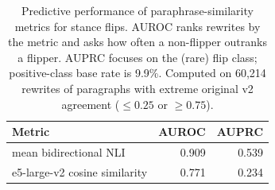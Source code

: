 \begin{table}[h]
  \centering
  \caption{Predictive performance of paraphrase-similarity metrics for stance flips. AUROC ranks rewrites by the metric and asks how often a non-flipper outranks a flipper. AUPRC focuses on the (rare) flip class; positive-class base rate is 9.9\%. Computed on 60,214 rewrites of paragraphs with extreme original v2 agreement ($\leq 0.25$ or $\geq 0.75$).}
  \label{tab:flip-prediction}
  \begin{tabular}{lrr}
    \toprule
    Metric & AUROC & AUPRC \\
    \midrule
    mean bidirectional NLI           & 0.909 & 0.539 \\
    e5-large-v2 cosine similarity    & 0.771 & 0.234 \\
    \bottomrule
  \end{tabular}
\end{table}

